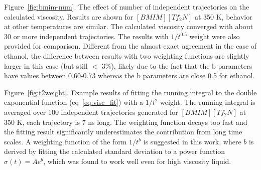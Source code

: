 \documentclass[12pt]{article}
\begin{document}
Figure~\ref{fig:bmim-num}.
The effect of number of independent trajectories on the calculated viscosity.
Results are shown for $[BMIM][Tf_2N]$ at 350 K, behavior at other temperatures are similar.
The calculated viscosity converged with about 30 or more independent trajectories.
The results with $1/t^{0.5}$ weight were also provided for comparison.
Different from the almost exact agreement in the case of ethanol,
the difference between results with two weighting functions are slightly larger in this case
(but still $<$ 3\%),
likely due to the fact that the b parameters have values between 0.60-0.73
whereas the b parameters are close 0.5 for ethanol.

Figure~\ref{fig:t2weight}.
Example results of fitting the running integral to the double exponential function (eq~\ref{eq:visc_fit}) with a $1/t^2$ weight.
The running integral is averaged over 100 independent trajectories generated for $[BMIM][Tf_2N]$ at 350 K,
each trajectory is 7 ns long.
The weighting function decays too fast and the fitting result significantly underestimates the contribution from long time scales.
A weighting function of the form $1/t^b$ is suggested in this work,
where $b$ is derived by fitting the calculated standard deviation to a power function $\sigma(t) = Ae^b$,
which was found to work well even for high viscosity liquid.



\newpage
\clearpage
\begin{figure}
\begin{center}
\caption{}
\label{fig:visc-longtraj}
\end{center}
\end{figure}

\newpage
\clearpage
\begin{figure}
\begin{center}
\caption{}
\label{fig:density}
\end{center}
\end{figure}


\newpage
\clearpage
\begin{figure}
\begin{center}
\caption{}
\label{fig:ethanol-ave}
\end{center}
\end{figure}
\end{document}
